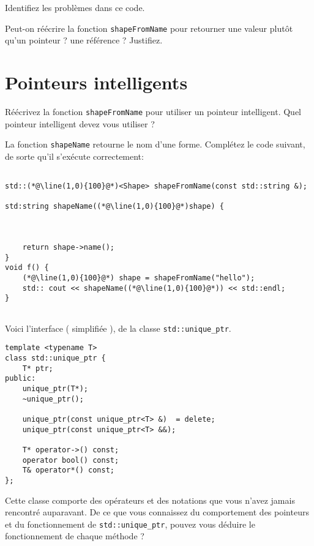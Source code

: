 \documentclass[9pt]{article}
\begin{document}
Identifiez les problèmes dans ce code.

Peut-on réécrire la fonction \lstinline{shapeFromName} pour retourner une valeur plutôt qu'un pointeur ? une référence ? Justifiez.


\newpage

\section{Pointeurs intelligents}

\qn
Réécrivez la fonction \lstinline{shapeFromName} pour utiliser un pointeur intelligent. Quel pointeur intelligent devez vous utiliser ?

\vspace{0.5cm}

\qn
La fonction \lstinline{shapeName} retourne le nom d'une forme.
Complétez le code suivant, de sorte qu'il s'exécute correctement:

\begin{lstlisting}

std::(*@\line(1,0){100}@*)<Shape> shapeFromName(const std::string &);

std:string shapeName((*@\line(1,0){100}@*)shape) {
	
	
	
	return shape->name();
}
void f() {
	(*@\line(1,0){100}@*) shape = shapeFromName("hello");
	std:: cout << shapeName((*@\line(1,0){100}@*)) << std::endl;
}
	

\end{lstlisting}
\vspace{1cm}

\qn

Voici l'interface ( simplifiée ), de la classe  \lstinline{std::unique_ptr}.

\begin{lstlisting}
template <typename T>
class std::unique_ptr {
	T* ptr;
public:
	unique_ptr(T*);
	~unique_ptr();
	
	unique_ptr(const unique_ptr<T> &)  = delete;
	unique_ptr(const unique_ptr<T> &&);
	
	T* operator->() const; 	
	operator bool() const;
	T& operator*() const;
};
\end{lstlisting}


Cette classe comporte des opérateurs et des notations que vous n'avez jamais rencontré auparavant.
De ce que vous connaissez du comportement des pointeurs et du fonctionnement de \lstinline{std::unique_ptr}, pouvez vous déduire le fonctionnement de chaque méthode ? 
\end{document}
